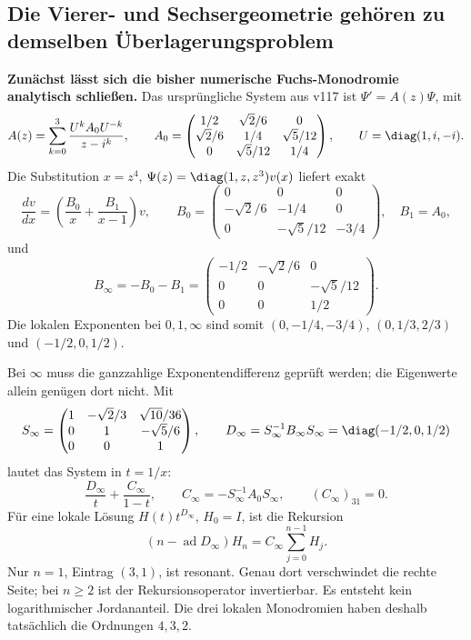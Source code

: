 \subsection{Die Vierer- und Sechsergeometrie gehören zu demselben Überlagerungsproblem}\label{sec:flavorcover}
\textbf{Zunächst lässt sich die bisher numerische Fuchs-Monodromie analytisch schließen.}
Das ursprüngliche System aus v117 ist $\Psi'=A(z)\Psi$, mit
\begin{equation}
A(z)=\sum_{k=0}^3\frac{U^kA_0U^{-k}}{z-i^k},\qquad
A_0=\begin{pmatrix}
1/2&\sqrt2/6&0\\
\sqrt2/6&1/4&\sqrt5/12\\
0&\sqrt5/12&1/4
\end{pmatrix},\qquad U=\diag(1,i,-i).
\end{equation}
Die Substitution $x=z^4$, $\Psi(z)=\diag(1,z,z^3)v(x)$ liefert exakt
\begin{equation}
\frac{dv}{dx}=\left(\frac{B_0}{x}+\frac{B_1}{x-1}\right)v,\qquad
B_0=\begin{pmatrix}
0&0&0\\-\sqrt2/6&-1/4&0\\0&-\sqrt5/12&-3/4
\end{pmatrix},\quad B_1=A_0,
\end{equation}
und
\begin{equation}
B_\infty=-B_0-B_1
=\begin{pmatrix}
-1/2&-\sqrt2/6&0\\0&0&-\sqrt5/12\\0&0&1/2
\end{pmatrix}.
\end{equation}
Die lokalen Exponenten bei $0,1,\infty$ sind somit
$(0,-1/4,-3/4)$, $(0,1/3,2/3)$ und $(-1/2,0,1/2)$.

Bei $\infty$ muss die ganzzahlige Exponentendifferenz geprüft werden; die Eigenwerte allein genügen dort nicht. Mit
\begin{equation}
S_\infty=\begin{pmatrix}
1&-\sqrt2/3&\sqrt{10}/36\\
0&1&-\sqrt5/6\\0&0&1
\end{pmatrix},\qquad
D_\infty=S_\infty^{-1}B_\infty S_\infty
=\diag(-1/2,0,1/2)
\end{equation}
lautet das System in $t=1/x$:
\begin{equation}
\frac{D_\infty}{t}+\frac{C_\infty}{1-t},
\qquad C_\infty=-S_\infty^{-1}A_0S_\infty,\qquad
(C_\infty)_{31}=0.
\end{equation}
Für eine lokale Lösung $H(t)t^{D_\infty}$, $H_0=I$, ist die Rekursion
\begin{equation}
(n-\operatorname{ad}D_\infty)H_n
=C_\infty\sum_{j=0}^{n-1}H_j.
\end{equation}
Nur $n=1$, Eintrag $(3,1)$, ist resonant. Genau dort verschwindet die rechte Seite; bei $n\ge2$ ist der Rekursionsoperator invertierbar. Es entsteht kein logarithmischer Jordananteil. Die drei lokalen Monodromien haben deshalb tatsächlich die Ordnungen $4,3,2$.

